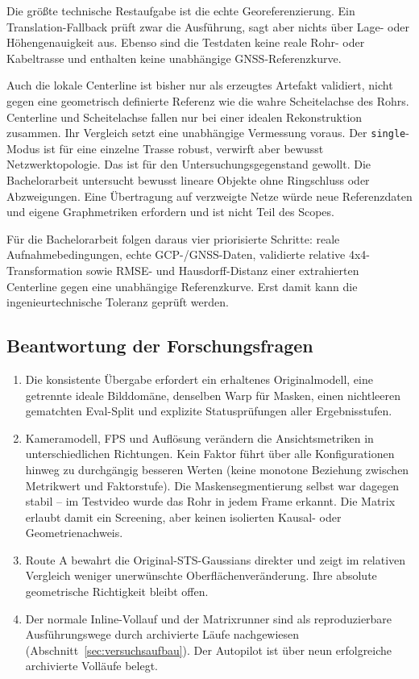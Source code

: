 Die größte technische Restaufgabe ist die echte Georeferenzierung. Ein
Translation-Fallback prüft zwar die Ausführung, sagt aber nichts über Lage-
oder Höhengenauigkeit aus. Ebenso sind die Testdaten keine reale Rohr- oder
Kabeltrasse und enthalten keine unabhängige GNSS-Referenzkurve.

Auch die lokale Centerline ist bisher nur als erzeugtes Artefakt validiert,
nicht gegen eine geometrisch definierte Referenz wie die wahre Scheitelachse
des Rohrs. Centerline und Scheitelachse fallen nur bei einer idealen
Rekonstruktion zusammen. Ihr Vergleich setzt eine unabhängige Vermessung
voraus. Der \texttt{single}-Modus ist für eine einzelne Trasse robust,
verwirft aber bewusst Netzwerktopologie. Das ist für den Untersuchungsgegenstand
gewollt. Die Bachelorarbeit untersucht bewusst lineare Objekte ohne
Ringschluss oder Abzweigungen. Eine Übertragung auf verzweigte Netze würde
neue Referenzdaten und eigene Graphmetriken erfordern und ist nicht Teil des
Scopes.

Für die Bachelorarbeit folgen daraus vier priorisierte Schritte: reale
Aufnahmebedingungen, echte GCP-/GNSS-Daten, validierte relative
4x4-Transformation sowie RMSE- und Hausdorff-Distanz einer extrahierten
Centerline gegen eine unabhängige Referenzkurve. Erst damit kann die
ingenieurtechnische Toleranz geprüft werden.

\subsection{Beantwortung der Forschungsfragen}

\begin{enumerate}
  \item Die konsistente Übergabe erfordert ein erhaltenes Originalmodell, eine
	  getrennte ideale Bilddomäne, denselben Warp für Masken, einen
	  nichtleeren gematchten Eval-Split und explizite Statusprüfungen aller
	  Ergebnisstufen.
  \item Kameramodell, FPS und Auflösung verändern die Ansichtsmetriken in
	  unterschiedlichen Richtungen. Kein Faktor führt über alle Konfigurationen
	  hinweg zu durchgängig besseren Werten (keine monotone Beziehung zwischen
	  Metrikwert und Faktorstufe). Die Maskensegmentierung selbst war dagegen
	  stabil – im Testvideo wurde das Rohr in jedem Frame erkannt. Die Matrix
	  erlaubt damit ein Screening, aber keinen isolierten Kausal- oder
	  Geometrienachweis.
  \item Route A bewahrt die Original-STS-Gaussians direkter und zeigt im
	  relativen Vergleich weniger unerwünschte Oberflächenveränderung. Ihre
	  absolute geometrische Richtigkeit bleibt offen.
  \item Der normale Inline-Vollauf und der Matrixrunner sind als
	  reproduzierbare Ausführungswege durch archivierte Läufe nachgewiesen
	  (Abschnitt~\ref{sec:versuchsaufbau}). Der Autopilot ist über neun erfolgreiche
	  archivierte Volläufe belegt.
\end{enumerate}
